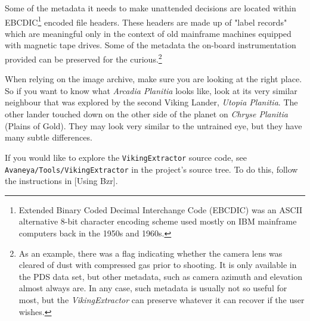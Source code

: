 Some of the metadata it needs to make unattended decisions are located within EBCDIC\footnote{Extended Binary Coded Decimal Interchange Code (EBCDIC) was an ASCII alternative 8-bit character encoding scheme used mostly on IBM mainframe computers back in the 1950s and 1960s.} encoded file headers. These headers are made up of "label records" which are meaningful only in the context of old mainframe machines equipped with magnetic tape drives. Some of the metadata the on-board instrumentation provided can be preserved for the curious.\footnote{As an example, there was a flag indicating whether the camera lens was cleared of dust with compressed gas prior to shooting. It is only available in the PDS data set, but other metadata, such as camera azimuth and elevation almost always are. In any case, such metadata is usually not so useful for most, but the {\it VikingExtractor} can preserve whatever it can recover if the user wishes.}

When relying on the image archive, make sure you are looking at the right place. So if you want to know what {\it Arcadia Planitia} looks like, look at its very similar neighbour that was explored by the second Viking Lander, {\it Utopia Planitia}. The other lander touched down on the other side of the planet on {\it Chryse Planitia} (Plains of Gold). They may look very similar to the untrained eye, but they have many subtle differences.

If you would like to explore the {\tt VikingExtractor} source code, see {\tt Avaneya/Tools/VikingExtractor} in the project's source tree. To do this, follow the instructions in [Using Bzr].

\StopChapter

